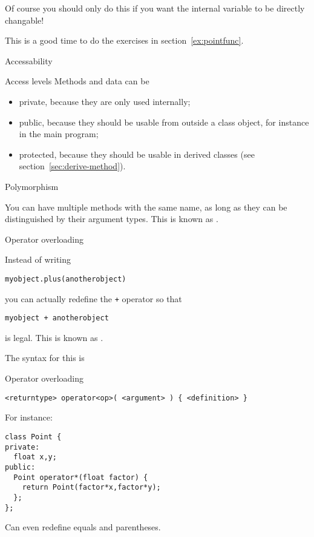 Of course you should only do this if you want the internal variable to
be directly changable!

\begin{exercise}
  This is a good time to do the exercises in section~\ref{ex:pointfunc}.
\end{exercise}

 {Accessability}

\begin{block}{Access levels}
  \label{sl:private-etc}
  Methods and data can be 
  \begin{itemize}
  \item private, because they are only used internally;
  \item public, because they should be usable from outside a class
    object, for instance in the main program;
  \item protected, because they should be usable in derived classes (see
    section~\ref{sec:derive-method}).
  \end{itemize}
\end{block}

 {Polymorphism}

You can have multiple methods with the same name, as long as they can
be distinguished by their argument types. This is known as .

 {Operator overloading}
\label{sec:operatordef}

Instead of writing 
\begin{lstlisting}
myobject.plus(anotherobject)
\end{lstlisting}
you can actually redefine the \lstinline{+} operator so that
\begin{lstlisting}
myobject + anotherobject
\end{lstlisting}
is legal. This is known as .

The syntax for this is
\begin{block}{Operator overloading}
  \label{sl:object-operator}
\begin{lstlisting}
<returntype> operator<op>( <argument> ) { <definition> }
\end{lstlisting}
For instance:
\begin{lstlisting}
class Point {
private:
  float x,y;
public:
  Point operator*(float factor) {
    return Point(factor*x,factor*y);
  };
};
\end{lstlisting}
Can even redefine equals and parentheses.
\end{block}

